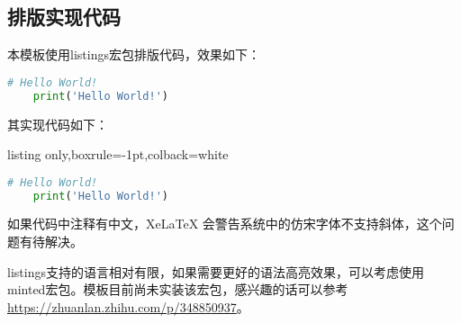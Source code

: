 \subsection{排版实现代码}

本模板使用listings宏包排版代码，效果如下：
\begin{lstlisting}[breaklines=true,language=Python]
    # Hello World!
    print('Hello World!')
\end{lstlisting}

其实现代码如下：
\begin{tcblisting}{listing only,boxrule=-1pt,colback=white}
\begin{lstlisting}[breaklines=true,language=Python]
    # Hello World!
    print('Hello World!')
\end{lstlisting}
\end{tcblisting}

如果代码中注释有中文，XeLaTeX 会警告系统中的仿宋字体不支持斜体，这个问题有待解决。

listings支持的语言相对有限，如果需要更好的语法高亮效果，可以考虑使用minted宏包。模板目前尚未实装该宏包，感兴趣的话可以参考\url{https://zhuanlan.zhihu.com/p/348850937}。
